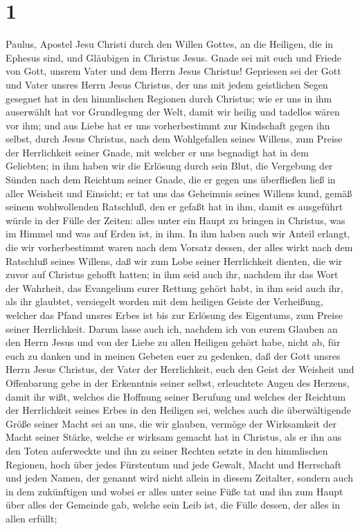 \hypertarget{section}{%
\section{1}\label{section}}

 Paulus, Apostel Jesu Christi durch den Willen Gottes, an
die Heiligen, die in Ephesus sind, und Gläubigen in Christus Jesus.
 Gnade sei mit euch und Friede von Gott, unsrem Vater und
dem Herrn Jesus Christus!  Gepriesen sei der Gott und
Vater unsres Herrn Jesus Christus, der uns mit jedem geistlichen Segen
gesegnet hat in den himmlischen Regionen durch Christus; 
wie er uns in ihm auserwählt hat vor Grundlegung der Welt, damit wir
heilig und tadellos wären vor ihm;  und aus Liebe hat er
uns vorherbestimmt zur Kindschaft gegen ihn selbst, durch Jesus
Christus, nach dem Wohlgefallen seines Willens,  zum
Preise der Herrlichkeit seiner Gnade, mit welcher er uns begnadigt hat
in dem Geliebten;  in ihm haben wir die Erlösung durch
sein Blut, die Vergebung der Sünden nach dem Reichtum seiner Gnade,
 die er gegen uns überfließen ließ in aller Weisheit und
Einsicht;  er tat uns das Geheimnis seines Willens kund,
gemäß seinem wohlwollenden Ratschluß, den er gefaßt hat in ihm,
 damit es ausgeführt würde in der Fülle der Zeiten: alles
unter ein Haupt zu bringen in Christus, was im Himmel und was auf Erden
ist, in ihm.  In ihm haben auch wir Anteil erlangt, die
wir vorherbestimmt waren nach dem Vorsatz dessen, der alles wirkt nach
dem Ratschluß seines Willens,  daß wir zum Lobe seiner
Herrlichkeit dienten, die wir zuvor auf Christus gehofft hatten;
 in ihm seid auch ihr, nachdem ihr das Wort der Wahrheit,
das Evangelium eurer Rettung gehört habt, in ihm seid auch ihr, als ihr
glaubtet, versiegelt worden mit dem heiligen Geiste der Verheißung,
 welcher das Pfand unsres Erbes ist bis zur Erlösung des
Eigentums, zum Preise seiner Herrlichkeit.  Darum lasse
auch ich, nachdem ich von eurem Glauben an den Herrn Jesus und von der
Liebe zu allen Heiligen gehört habe,  nicht ab, für euch
zu danken und in meinen Gebeten euer zu gedenken,  daß
der Gott unsres Herrn Jesus Christus, der Vater der Herrlichkeit, euch
den Geist der Weisheit und Offenbarung gebe in der Erkenntnis seiner
selbst,  erleuchtete Augen des Herzens, damit ihr wißt,
welches die Hoffnung seiner Berufung und welches der Reichtum der
Herrlichkeit seines Erbes in den Heiligen sei,  welches
auch die überwältigende Größe seiner Macht sei an uns, die wir glauben,
vermöge der Wirksamkeit der Macht seiner Stärke,  welche
er wirksam gemacht hat in Christus, als er ihn aus den Toten auferweckte
und ihn zu seiner Rechten setzte in den himmlischen Regionen,
 hoch über jedes Fürstentum und jede Gewalt, Macht und
Herrschaft und jeden Namen, der genannt wird nicht allein in diesem
Zeitalter, sondern auch in dem zukünftigen  und wobei er
alles unter seine Füße tat und ihn zum Haupt über alles der Gemeinde
gab,  welche sein Leib ist, die Fülle dessen, der alles
in allen erfüllt;

